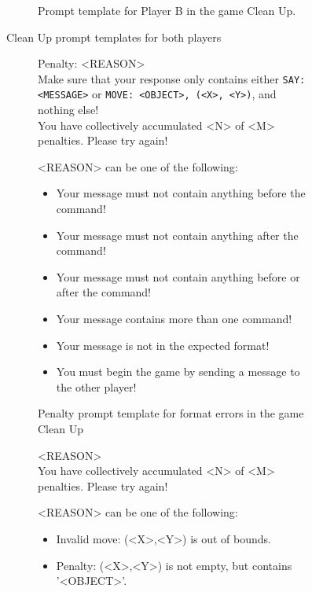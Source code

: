 \documentclass[../main.tex]{subfiles}
\begin{document}
\begin{figure}
\begin{subfigure}[b]{0.48\textwidth}
\caption{Prompt template for Player B in the game Clean Up.}
\label{fig:clean_up_player_b}
\end{subfigure}
\caption{Clean Up prompt templates for both players} \label{fig:clean_up_prompt_templates}
\end{figure}

\begin{figure}
  \centering
  \begin{subfigure}[b]{1\textwidth}
      \begin{prompt}
        Penalty: <REASON> \\
        Make sure that your response only contains either \verb|SAY: <MESSAGE>| or \verb|MOVE: <OBJECT>, (<X>, <Y>)|, and nothing else! \\
        You have collectively accumulated <N> of <M> penalties. Please try again!
      \end{prompt}
      \small
      <REASON> can be one of the following:
        \begin{itemize}
          \item Your message must not contain anything before the command!
          \item Your message must not contain anything after the command!
          \item Your message must not contain anything before or after the command!
          \item Your message contains more than one command!
          \item Your message is not in the expected format!
          \item You must begin the game by sending a message to the other player!
        \end{itemize}
    \caption{Penalty prompt template for format errors in the game Clean Up}
    \label{fig:clean_up_format_error}
  \end{subfigure}
  \begin{subfigure}[b]{1\textwidth}
    \begin{prompt}
        <REASON> \\
        You have collectively accumulated <N> of <M> penalties. Please try again!
    \end{prompt}
    \small <REASON> can be one of the following:
      \begin{itemize}
          \item Invalid move: (<X>,<Y>) is out of bounds.
          \item Penalty: (<X>,<Y>) is not empty, but contains '<OBJECT>'.

\end{itemize}
\end{subfigure}
\end{figure}
\end{document}
